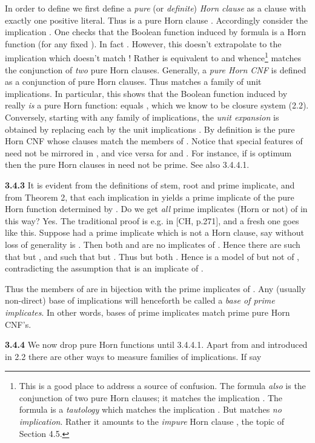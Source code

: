 \documentclass[11pt]{article}
\begin{document}
In order to define  we first define a {\it pure} (or {\it definite}) {\it Horn clause} as a clause with exactly one positive literal.
 Thus  is a pure Horn clause . Accordingly consider the implication . One checks that the Boolean function induced by formula  is a Horn function  (for any fixed ). In fact . However, this doesn't extrapolate to the implication  which doesn't match ! Rather   is equivalent to  and whence\footnote{This is a good place to address a source of confusion. The formula  {\it also} is the conjunction of two pure Horn clauses; it matches the implication . The formula  is a {\it tautology} which matches the implication . But  matches {\it no implication}. Rather it amounts to the {\it impure} Horn clause , the topic of Section 4.5.} matches the conjunction  of {\it two} pure Horn clauses. Generally, a {\it pure Horn CNF}  is defined as a conjunction of  pure Horn clauses. Thus  matches a family  of unit implications. In particular, this shows that the Boolean function  induced by  really {\it is} a pure Horn function:  equals , which we know to be  closure system (2.2). Conversely, starting with any family  of implications, the {\it unit expansion}  is obtained by replacing each  by the unit implications . By definition  is the pure Horn CNF whose clauses match the members of . Notice that special features of  need not be mirrored in , and vice versa for  and .
 For instance, if  is optimum then the pure Horn clauses in  need not  be prime. See also 3.4.4.1. 
 

{\bf 3.4.3} It is evident from the definitions of stem, root and prime implicate, and from Theorem 2, that each implication in  yields a prime implicate of the pure Horn function  determined by . Do we get {\it all} prime implicates (Horn or not) of  in this way? Yes. The traditional proof is e.g. in [CH, p.271], and a fresh one goes like this.
Suppose   had a prime implicate  which is not a Horn clause, say without loss of generality  is . Then both  and  are no implicates of . Hence there are  such that  but , and such that  but . Thus  but both . Hence  is a model of  but not of , contradicting the assumption that  is an implicate of . \quad 

Thus the members of  are in bijection with the prime implicates of . Any (usually non-direct) base of implications  will henceforth be called a {\it base of prime implicates}. In other words, bases of prime implicates match prime pure Horn CNF's.


{\bf 3.4.4} We now drop pure Horn functions until 3.4.4.1. Apart from  and  introduced in 2.2 there are other ways to measure families of implications. If say
\end{document}
